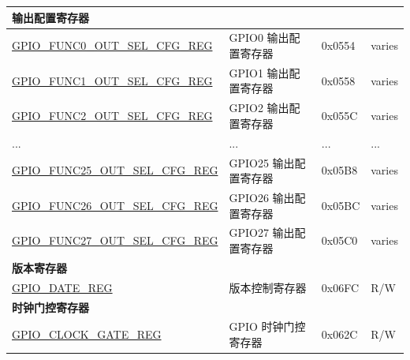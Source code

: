\begin{longtable}{ | p{5.8cm} | p{7.2cm} | p{1.3cm} | p{2cm} | }
\multicolumn{4}{|l|}{\textbf{输出配置寄存器}} \\ \hline
\hyperref[regdesc:GPIOFUNCNOUTSELCFGREG]{GPIO\_FUNC0\_OUT\_SEL\_CFG\_REG} & GPIO0 输出配置寄存器 & 0x0554 & varies \\ \hline
\hyperref[regdesc:GPIOFUNCNOUTSELCFGREG]{GPIO\_FUNC1\_OUT\_SEL\_CFG\_REG} & GPIO1 输出配置寄存器 & 0x0558 & varies \\ \hline
\hyperref[regdesc:GPIOFUNCNOUTSELCFGREG]{GPIO\_FUNC2\_OUT\_SEL\_CFG\_REG} & GPIO2 输出配置寄存器 & 0x055C & varies \\ \hline
...& ... & ... & ... \\ \hline
\hyperref[regdesc:GPIOFUNCNOUTSELCFGREG]{GPIO\_FUNC25\_OUT\_SEL\_CFG\_REG} & GPIO25 输出配置寄存器 & 0x05B8 & varies \\ \hline
\hyperref[regdesc:GPIOFUNCNOUTSELCFGREG]{GPIO\_FUNC26\_OUT\_SEL\_CFG\_REG} & GPIO26 输出配置寄存器 & 0x05BC & varies \\ \hline
\hyperref[regdesc:GPIOFUNCNOUTSELCFGREG]{GPIO\_FUNC27\_OUT\_SEL\_CFG\_REG} & GPIO27 输出配置寄存器 & 0x05C0 & varies \\ \hline

\multicolumn{4}{|l|}{\textbf{版本寄存器}} \\ \hline
\hyperref[regdesc:GPIOREGDATEREG]{GPIO\_DATE\_REG} & 版本控制寄存器 & 0x06FC & R/W \\ \hline

\multicolumn{4}{|l|}{\textbf{时钟门控寄存器}} \\ \hline
\hyperref[regdesc:GPIOCLOCKGATEREG]{GPIO\_CLOCK\_GATE\_REG} & GPIO 时钟门控寄存器 & 0x062C & R/W \\ \hline
\end{longtable}

